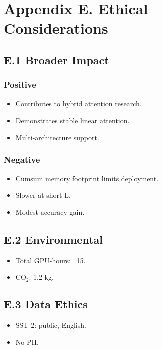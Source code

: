 \section{Appendix E. Ethical Considerations}

\subsection{E.1 Broader Impact}

\subsubsection{Positive}
\begin{itemize}
\item Contributes to hybrid attention research.
\item Demonstrates stable linear attention.
\item Multi-architecture support.

\end{itemize}
\subsubsection{Negative}
\begin{itemize}
\item Cumsum memory footprint limits deployment.
\item Slower at short L.
\item Modest accuracy gain.

\end{itemize}
\subsection{E.2 Environmental}

\begin{itemize}
\item Total GPU-hours: ~15.
\item CO$_2$: 1.2 kg.

\end{itemize}
\subsection{E.3 Data Ethics}

\begin{itemize}
\item SST-2: public, English.
\item No PII.

\end{itemize}
